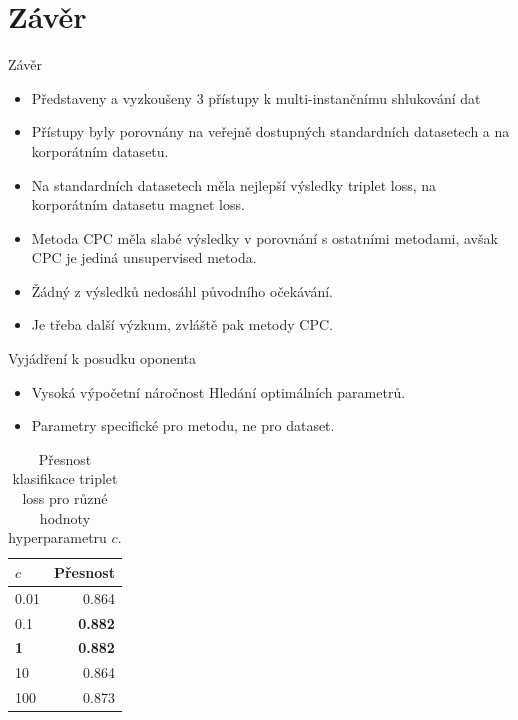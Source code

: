 \documentclass[10pt]{beamer}
\begin{document}
\section{Závěr}

\begin{frame}{Závěr}
	\begin{itemize}
		\item Představeny a vyzkoušeny 3 přístupy k multi-instančnímu shlukování dat
		\item Přístupy byly porovnány na veřejně dostupných standardních datasetech a na korporátním datasetu.
		\item Na standardních datasetech měla nejlepší výsledky triplet loss, na korporátním datasetu magnet loss.
		\item Metoda CPC měla slabé výsledky v porovnání s ostatními metodami, avšak CPC je jediná unsupervised metoda.
		\item Žádný z výsledků nedosáhl původního očekávání.
		\item Je třeba další výzkum, zvláště pak metody CPC.
	\end{itemize}
\end{frame}

\begin{frame}{Vyjádření k posudku oponenta}
  \begin{itemize}
    \item Vysoká výpočetní náročnost Hledání optimálních parametrů.
    \item Parametry specifické pro metodu, ne pro dataset.
  \end{itemize}
\end{frame}

\begin{frame}
  \begin{table}
    \centering
    \begin{tabular}{lr}
      \toprule
      \( c \)    & Přesnost \\
      \midrule
      0.01       & 0.864 \\
      0.1        & \textbf{0.882} \\
      \textbf{1} & \textbf{0.882} \\
      10         & 0.864 \\
      100        & 0.873 \\
      \bottomrule
    \end{tabular}
    \caption{Přesnost klasifikace triplet loss pro různé hodnoty hyperparametru \( c \).}
  \end{table}
\end{frame}
\end{document}

